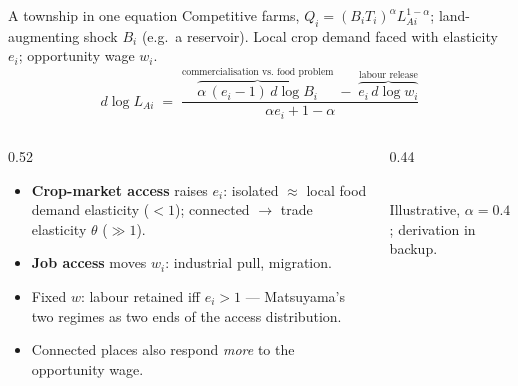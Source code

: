 \documentclass[10pt,aspectratio=169]{beamer}
\begin{document}
\begin{frame}{A township in one equation}
  Competitive farms, $Q_i=(B_iT_i)^{\alpha}L_{Ai}^{1-\alpha}$; land-augmenting shock $B_i$
  (e.g.\ a reservoir). Local crop demand faced with elasticity $e_i$; opportunity wage $w_i$.
  \begin{equation*}
    d\log L_{Ai}
    \;=\;
    \frac{\overbrace{\alpha\,(e_i-1)\,d\log B_i}^{\text{commercialisation vs.\ food problem}}
          \;-\;\overbrace{e_i\,d\log w_i}^{\text{labour release}}}
         {\alpha e_i + 1-\alpha}
  \end{equation*}
  \begin{columns}[T]
    \begin{column}{0.52\textwidth}
      \footnotesize
      \begin{itemize}
        \item \textbf{Crop-market access} raises $e_i$: isolated $\approx$ local food
              demand elasticity ($<1$); connected $\to$ trade elasticity $\theta$ ($\gg1$).
        \item \textbf{Job access} moves $w_i$: industrial pull, migration.
        \item Fixed $w$: labour retained iff $e_i>1$ --- Matsuyama's two regimes as two ends
              of the access distribution.
        \item Connected places also respond \emph{more} to the opportunity wage.
      \end{itemize}
    \end{column}
    \begin{column}{0.44\textwidth}
      \\
      \tiny Illustrative, $\alpha=0.4$; derivation in backup.
    \end{column}
  \end{columns}
\end{frame}
\end{document}

